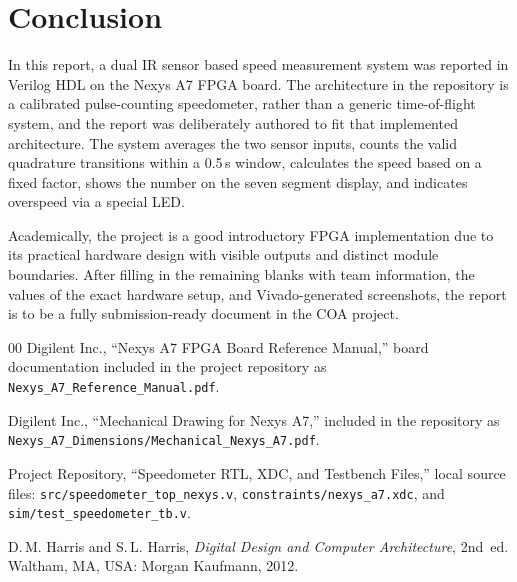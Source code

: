\documentclass[conference,a4paper]{IEEEtran}
\begin{document}
\section{Conclusion}
In this report, a dual IR sensor based speed measurement system was reported in Verilog HDL on the Nexys A7 FPGA board. The architecture in the repository is a calibrated pulse-counting speedometer, rather than a generic time-of-flight system, and the report was deliberately authored to fit that implemented architecture. The system averages the two sensor inputs, counts the valid quadrature transitions within a 0.5\,s window, calculates the speed based on a fixed factor, shows the number on the seven segment display, and indicates overspeed via a special LED.

Academically, the project is a good introductory FPGA implementation due to its practical hardware design with visible outputs and distinct module boundaries. After filling in the remaining blanks with team information, the values of the exact hardware setup, and Vivado-generated screenshots, the report is to be a fully submission-ready document in the COA project.

\begin{thebibliography}{00}
Digilent Inc., ``Nexys A7 FPGA Board Reference Manual,'' board documentation included in the project repository as \texttt{Nexys\_A7\_Reference\_Manual.pdf}.

Digilent Inc., ``Mechanical Drawing for Nexys A7,'' included in the repository as \texttt{Nexys\_A7\_Dimensions/Mechanical\_Nexys\_A7.pdf}.

Project Repository, ``Speedometer RTL, XDC, and Testbench Files,'' local source files: \texttt{src/speedometer\_top\_nexys.v}, \texttt{constraints/nexys\_a7.xdc}, and \texttt{sim/test\_speedometer\_tb.v}.

D.\,M. Harris and S.\,L. Harris, \textit{Digital Design and Computer Architecture}, 2nd~ed. Waltham, MA, USA: Morgan Kaufmann, 2012.
\end{thebibliography}

\onecolumn
\end{document}
